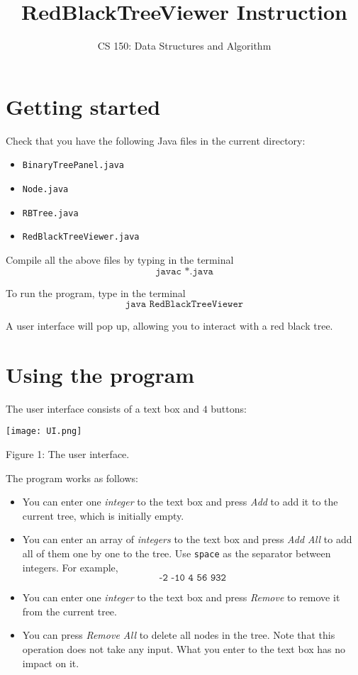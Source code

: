 \documentclass[12pt]{article}
\title{RedBlackTreeViewer Instruction}
\author{CS 150: Data Structures and Algorithm}
\date{}
\begin{document}
\maketitle

\section{Getting started}
Check that you have the following Java files in the current directory:
\begin{itemize}
	\item \texttt{BinaryTreePanel.java}
	\item \texttt{Node.java}
	\item \texttt{RBTree.java}
	\item \texttt{RedBlackTreeViewer.java}
\end{itemize}

Compile all the above files by typing in the terminal
$$\texttt{javac *.java}$$

To run the program, type in the terminal
$$\texttt{java RedBlackTreeViewer}$$

A user interface will pop up, allowing you to interact with a red black tree.

\section{Using the program}
The user interface consists of a text box and $4$ buttons:
\begin{center}
	\texttt{[image: UI.png]}

	Figure 1: The user interface.
\end{center}

The program works as follows:
\begin{itemize}
	\item You can enter one {\it integer} to the text box and press {\it Add} to add it to the current tree, which is initially empty.
	\item You can enter an array of {\it integers} to the text box and press {\it Add All} to add all of them one by one to the tree. Use \texttt{space} as the separator between integers. For example, $$\texttt{-2 -10 4 56 932}$$
	\item You can enter one {\it integer} to the text box and press {\it Remove} to remove it from the current tree.
	\item You can press {\it Remove All} to delete all nodes in the tree. Note that this operation does not take any input. What you enter to the text box has no impact on it.
\end{itemize}
\end{document}
